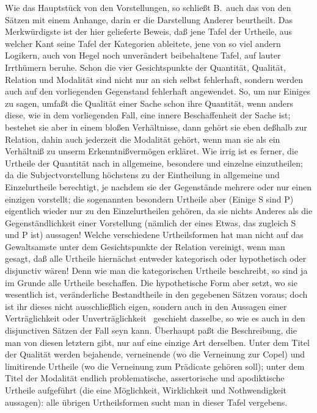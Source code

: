 Wie das Hauptstück von den Vorstellungen, so schließt B.\ auch das von den Sätzen mit einem Anhange, darin er die Darstellung Anderer beurtheilt. Das Merkwürdigste ist der hier gelieferte Beweis, daß jene Tafel der Urtheile, aus welcher Kant seine Tafel der Kategorien ableitete, jene von so viel andern Logikern, auch von Hegel noch unverändert beibehaltene Tafel, auf lauter Irrthümern beruhe. Schon die vier Gesichtspunkte der Quantität, Qualität, Relation und Modalität sind nicht nur an sich selbst fehlerhaft, sondern werden auch auf den vorliegenden Gegenstand fehlerhaft angewendet. So, um nur Einiges zu sagen, umfaßt die Qualität einer Sache schon ihre Quantität, wenn anders diese, wie in dem vorliegenden Fall, eine innere Beschaffenheit der Sache ist; bestehet sie aber in einem bloßen Verhältnisse, dann gehört sie eben deßhalb zur Relation, dahin auch jederzeit die Modalität gehört, wenn man sie als ein Verhältniß zu unserm Erkenntnißvermögen erkläret. Wie irrig ist es ferner, die Urtheile der Quantität nach in allgemeine, besondere und einzelne einzutheilen; da die Subjectvorstellung höchstens zu der Eintheilung in allgemeine und Einzelurtheile berechtigt, je nachdem sie der Gegenstände mehrere oder nur einen einzigen vorstellt; die sogenannten besondern Urtheile aber (Einige S sind P) eigentlich wieder nur zu den Einzelurtheilen gehören, da sie nichts Anderes als die Gegenständlichkeit einer Vorstellung (nämlich der eines Etwas, das zugleich S und P ist) aussagen! Welche verschiedene Urtheilsformen hat man nicht auf das Gewaltsamste unter dem Gesichtspunkte der Relation vereinigt, wenn man gesagt, daß alle Urtheile hiernächst entweder kategorisch oder hypothetisch oder disjunctiv wären! Denn wie man die kategorischen Urtheile beschreibt, so sind ja im Grunde alle Urtheile beschaffen. Die hypothetische Form aber setzt, wo sie wesentlich ist, veränderliche Bestandtheile in den gegebenen Sätzen voraus; doch ist ihr dieses nicht ausschließlich eigen, sondern auch in den Aussagen einer Verträglichkeit oder Unverträglichkeit \umA\ geschieht dasselbe, so wie es auch in den disjunctiven Sätzen der Fall seyn kann. Überhaupt paßt die Beschreibung, die man von diesen  letztern gibt, nur auf eine einzige Art derselben. Unter dem Titel der Qualität werden bejahende, verneinende (wo die Verneinung zur Copel) und limitirende Urtheile (wo die Verneinung zum Prädicate gehören soll); unter dem Titel der Modalität endlich problematische, assertorische und apodiktische Urtheile aufgeführt (die eine Möglichkeit, Wirklichkeit und Nothwendigkeit aussagen): alle übrigen Urtheilsformen sucht man in dieser Tafel vergebens. \par
